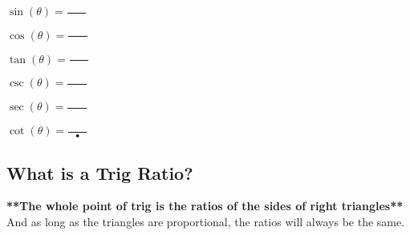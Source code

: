 \documentclass[12pt]{article}
\begin{document}
\begin{multicols}{2}

	$\sin(\theta) = \frac{\hspace{1cm}}{ }$\\

		\vspace{1cm}
	
	$\cos(\theta) = \frac{\hspace{1cm}}{ }$\\

		\vspace{1cm}
	
	$\tan(\theta) = \frac{\hspace{1cm}}{ }$\\
	
		\vspace{1cm}	
	
	$\csc(\theta) = \frac{\hspace{1cm}}{}$\\

		\vspace{1cm}
	
	$\sec(\theta) = \frac{\hspace{1cm}}{}$\\

		\vspace{1cm}
	
	$\cot(\theta) = \frac{\hspace{1cm}}{•}$\\

		\vspace{1cm}
			
\end{multicols}


\subsection*{What is a Trig Ratio?} %

\textbf{**The whole point of trig is the ratios of the sides of right triangles**} And as long as the triangles are proportional, the ratios will always be the same.
\end{document}
